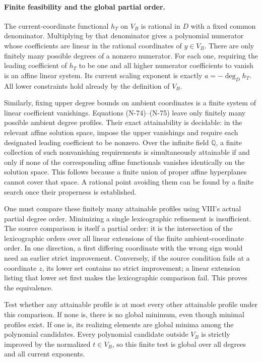 \paragraph{Finite feasibility and the global partial order.}
The current-coordinate functional $h_T$ on $V_B$ is rational
in $D$ with a fixed common denominator.  Multiplying by that
denominator gives a polynomial numerator whose coefficients
are linear in the rational coordinates of $y\in V_B$.
There are only finitely many possible degrees of a nonzero
numerator.  For each one, requiring the leading coefficient
of $h_T$ to be one and all higher numerator coefficients to
vanish is an affine linear system.  Its current scaling
exponent is exactly $a=-\deg_D h_T$.  All lower constraints
hold already by the definition of $V_B$.

Similarly, fixing upper degree bounds on ambient coordinates
is a finite system of linear coefficient vanishings.
Equations (N-74)--(N-75) leave only finitely many possible
ambient degree profiles.  Their exact attainability is
decidable: in the relevant affine solution space, impose
the upper vanishings and require each designated leading
coefficient to be nonzero.  Over the infinite field
$\mathbb Q$, a finite collection of such nonvanishing
requirements is simultaneously attainable if and only if
none of the corresponding affine functionals vanishes
identically on the solution space.  This follows because
a finite union of proper affine hyperplanes cannot cover
that space.  A rational point avoiding them can be found
by a finite search once their properness is established.

One must compare these finitely many attainable profiles
using VIII's actual partial degree order.  Minimizing a
single lexicographic refinement is insufficient.  The
source comparison is itself a partial order: it is the
intersection of the lexicographic orders over all linear
extensions of the finite ambient-coordinate order.  In
one direction, a first differing coordinate with the wrong
sign would need an earlier strict improvement.  Conversely,
if the source condition fails at a coordinate $z$, its lower
set contains no strict improvement; a linear extension
listing that lower set first makes the lexicographic
comparison fail.  This proves the equivalence.

Test whether any attainable profile is at most every other
attainable profile under this comparison.  If none is,
there is no global minimum, even though minimal profiles
exist.  If one is, its realizing elements are global
minima among the polynomial candidates.  Every polynomial
candidate outside $V_B$ is strictly improved by the
normalized $t\in V_B$, so this finite test is global over
all degrees and all current exponents.

